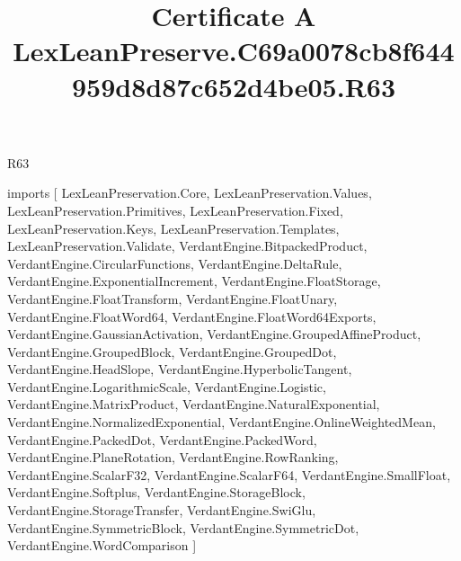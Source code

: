 \begin{lexlean}{R63}
\title{Certificate A LexLeanPreserve.C69a0078cb8f644959d8d87c652d4be05.R63}
\begin{coremodule}
imports [
  LexLeanPreservation.Core,
  LexLeanPreservation.Values,
  LexLeanPreservation.Primitives,
  LexLeanPreservation.Fixed,
  LexLeanPreservation.Keys,
  LexLeanPreservation.Templates,
  LexLeanPreservation.Validate,
  VerdantEngine.BitpackedProduct,
  VerdantEngine.CircularFunctions,
  VerdantEngine.DeltaRule,
  VerdantEngine.ExponentialIncrement,
  VerdantEngine.FloatStorage,
  VerdantEngine.FloatTransform,
  VerdantEngine.FloatUnary,
  VerdantEngine.FloatWord64,
  VerdantEngine.FloatWord64Exports,
  VerdantEngine.GaussianActivation,
  VerdantEngine.GroupedAffineProduct,
  VerdantEngine.GroupedBlock,
  VerdantEngine.GroupedDot,
  VerdantEngine.HeadSlope,
  VerdantEngine.HyperbolicTangent,
  VerdantEngine.LogarithmicScale,
  VerdantEngine.Logistic,
  VerdantEngine.MatrixProduct,
  VerdantEngine.NaturalExponential,
  VerdantEngine.NormalizedExponential,
  VerdantEngine.OnlineWeightedMean,
  VerdantEngine.PackedDot,
  VerdantEngine.PackedWord,
  VerdantEngine.PlaneRotation,
  VerdantEngine.RowRanking,
  VerdantEngine.ScalarF32,
  VerdantEngine.ScalarF64,
  VerdantEngine.SmallFloat,
  VerdantEngine.Softplus,
  VerdantEngine.StorageBlock,
  VerdantEngine.StorageTransfer,
  VerdantEngine.SwiGlu,
  VerdantEngine.SymmetricBlock,
  VerdantEngine.SymmetricDot,
  VerdantEngine.WordComparison
]


\end{coremodule}
\end{lexlean}
